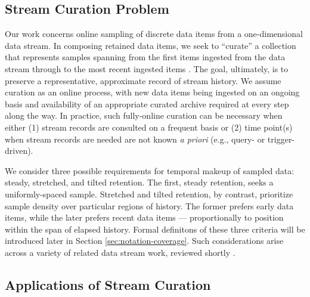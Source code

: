 \subsection{Stream Curation Problem}

Our work concerns online sampling of discrete data items from a one-dimensional data stream.
In composing retained data items, we seek to ``curate'' a collection that represents samples spanning from the first items ingested from the data stream through to the most recent ingested items \citep{moreno2024algorithms}.
The goal, ultimately, is to preserve a representative, approximate record of stream history.
We assume curation as an online process, with new data items being ingested on an ongoing basis and availability of an appropriate curated archive required at every step along the way.
In practice, such fully-online curation can be necessary when either (1) stream records are consulted on a frequent basis or (2) time point(s) when stream records are needed are not known \textit{a priori} (e.g., query- or trigger-driven).

We consider three possible requirements for temporal makeup of sampled data: steady, stretched, and tilted retention.
The first, steady retention, seeks a uniformly-spaced sample.
Stretched and tilted retention, by contrast, prioritize sample density over particular regions of history.
The former prefers early data items, while the later prefers recent data items --- proportionally to position within the span of elapsed history.
Formal definitons of these three criteria will be introduced later in Section \ref{sec:notation-coverage}.
Such considerations arise across a variety of related data stream work, reviewed shortly \citep{aggarwal2003framework,han2005stream}.


\subsection{Applications of Stream Curation}

